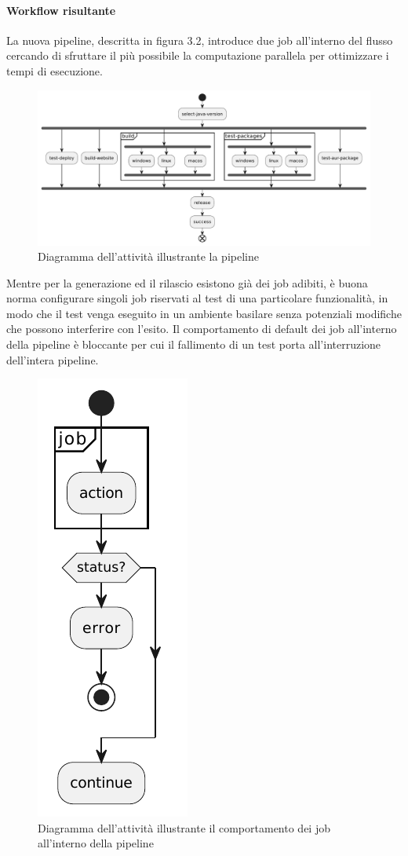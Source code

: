 \paragraph{Workflow risultante} La nuova pipeline, descritta in figura 3.2, introduce due job all'interno del flusso cercando di sfruttare il più possibile la computazione parallela per ottimizzare i tempi di esecuzione.
\begin{figure}[H]
	\centering
	\includegraphics[width=1\linewidth]{figures/activity-diagram-pipeline.pdf}
	\caption{Diagramma dell'attività illustrante la pipeline}
	\label{fig:activity-diagram-pipeline}
\end{figure}
Mentre per la generazione ed il rilascio esistono già dei job adibiti, è buona norma configurare singoli job riservati al test di una particolare funzionalità, in modo che il test venga eseguito in un ambiente basilare senza potenziali modifiche che possono interferire con l'esito. Il comportamento di default dei job all'interno della pipeline è bloccante per cui il fallimento di un test porta all'interruzione dell'intera pipeline.

\begin{figure}[H]
	\centering
	\includegraphics[width=.13\linewidth]{figures/activity-diagram-job.pdf}
	\caption{Diagramma dell'attività illustrante il comportamento dei job all'interno della pipeline}
	\label{fig:activity-diagram-job}
\end{figure}

